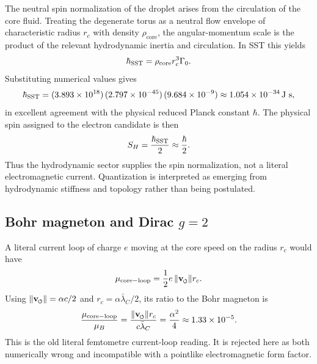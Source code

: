 \documentclass[11pt]{article}
\newcommand{\vnorm}{\lVert \mathbf{v}_{\mkern-2mu\scriptscriptstyle\boldsymbol{\circlearrowleft}} \rVert}  %
\newcommand{\rc}{r_c}                                    %
\newcommand{\rhocore}{\rho_{\text{core}}}
\newcommand{\GammaSST}{\Gamma_0}                         %
\newcommand{\lambdabarC}{\bar{\lambda}_C}
\begin{document}
The neutral spin normalization of the droplet arises from the circulation of the core fluid.  Treating the degenerate torus as a neutral flow envelope of characteristic radius $\rc$ with density $\rhocore$, the angular-momentum scale is the product of the relevant hydrodynamic inertia and circulation.  In SST this yields
\begin{equation}
    \hbar_{\rm SST} = \rhocore \rc^3 \GammaSST.
    \label{eq:hbar_sst}
\end{equation}
Substituting numerical values gives
\begin{equation}
    \hbar_{\rm SST} = (3.893\times 10^{18})\,(2.797\times 10^{-45})\,(9.684\times 10^{-9}) \approx 1.054\times 10^{-34}\,\text{J s},
\end{equation}
in excellent agreement with the physical reduced Planck constant $\hbar$.  The physical spin assigned to the electron candidate is then
\begin{equation}
    S_H = \frac{\hbar_{\rm SST}}{2} \approx \frac{\hbar}{2}.
    \label{eq:hydro_spin_half}
\end{equation}
Thus the hydrodynamic sector supplies the spin normalization, not a literal electromagnetic current.  Quantization is interpreted as emerging from hydrodynamic stiffness and topology rather than being postulated.

\subsection{Bohr magneton and Dirac $g=2$}

A literal current loop of charge $e$ moving at the core speed on the radius $\rc$ would have
\begin{equation}
    \mu_{\rm core-loop}
    = \frac{1}{2}e\,\vnorm\rc .
    \label{eq:core_loop_mu}
\end{equation}
Using $\vnorm=\alpha c/2$ and $\rc=\alpha\lambdabarC/2$, its ratio to the Bohr magneton is
\begin{equation}
    \frac{\mu_{\rm core-loop}}{\mu_B}
    = \frac{\vnorm\rc}{c\lambdabarC}
    = \frac{\alpha^2}{4}
    \approx 1.33\times10^{-5}.
    \label{eq:core_loop_failure}
\end{equation}
This is the old literal femtometre current-loop reading.  It is rejected here as both numerically wrong and incompatible with a pointlike electromagnetic form factor.
\end{document}
